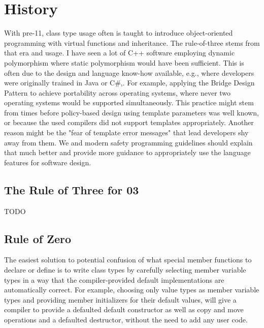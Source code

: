 \documentclass[ebook,11pt,article]{memoir}
\begin{document}






\chapter{History}
With pre-\Cpp{}11, class type usage often is taught to introduce object-oriented programming with virtual functions and inheritance. The rule-of-three stems from that era and usage\cite{Meyers2005}. I have seen a lot of C++ software employing dynamic polymorphism where static polymorphism would have been sufficient. This is often due to the design and language know-how available, e.g., where developers were originally trained in Java or C\#,. For example, applying the Bridge Design Pattern \cite{GoF} to achieve portability across operating systems, where never two operating systems would be supported simultaneously. This practice might stem from times before policy-based design using template parameters was well known, or because the used compilers did not support templates appropriately. Another reason might be the "fear of template error messages" that lead developers shy away from them. We and modern \Cpp{} safety programming guidelines should explain that much better and provide more guidance to appropriately use the language features for software design.


\section{The Rule of Three for \Cpp{}03}
TODO \cite{meyers2005}

\section{Rule of Zero}
The easiest solution to potential confusion of what special member functions to declare or define is to write class types by carefully selecting member variable types in a way that the compiler-provided default implementations are automatically correct.
For example, choosing only value types as member variable types and providing member initializers for their default values, will give a compiler to provide a defaulted default constructor as well as copy and move operations and a defaulted destructor, without the need to add any user code.
\end{document}
